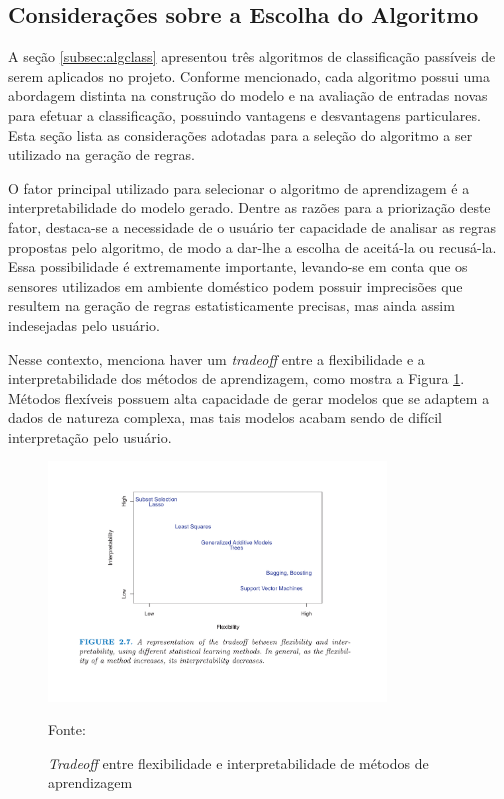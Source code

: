 \subsection{Considerações sobre a Escolha do Algoritmo}
A seção \ref{subsec:algclass} apresentou três algoritmos de classificação passíveis de serem aplicados no projeto. Conforme mencionado, cada algoritmo possui uma abordagem distinta na construção do modelo e na avaliação de entradas novas para efetuar a classificação, possuindo vantagens e desvantagens particulares. Esta seção lista as considerações adotadas para a seleção do algoritmo a ser utilizado na geração de regras.

O fator principal utilizado para selecionar o algoritmo de aprendizagem é a interpretabilidade do modelo gerado. Dentre as razões para a priorização deste fator, destaca-se a necessidade de o usuário ter capacidade de analisar as regras propostas pelo algoritmo, de modo a dar-lhe a escolha de aceitá-la ou recusá-la. Essa possibilidade é extremamente importante, levando-se em conta que os sensores utilizados em ambiente doméstico podem possuir imprecisões que resultem na geração de regras estatisticamente precisas, mas ainda assim indesejadas pelo usuário.

Nesse contexto, \cite{james2014} menciona haver um \textit{tradeoff} entre a flexibilidade e a interpretabilidade dos métodos de aprendizagem, como mostra a Figura \ref{fig:interpretabilidade_algoritmos}. Métodos flexíveis possuem alta capacidade de gerar modelos que se adaptem a dados de natureza complexa, mas tais modelos acabam sendo de difícil interpretação pelo usuário. 

\begin{figure}[h]
	\centering
	\caption{\textit{Tradeoff} entre flexibilidade e interpretabilidade de métodos de aprendizagem}
  \includegraphics[width=0.8\textwidth]{imagens/interpretabilidade_algoritmos.pdf}
  \label{fig:interpretabilidade_algoritmos}  
  
  Fonte: \cite{james2014}
\end{figure}

